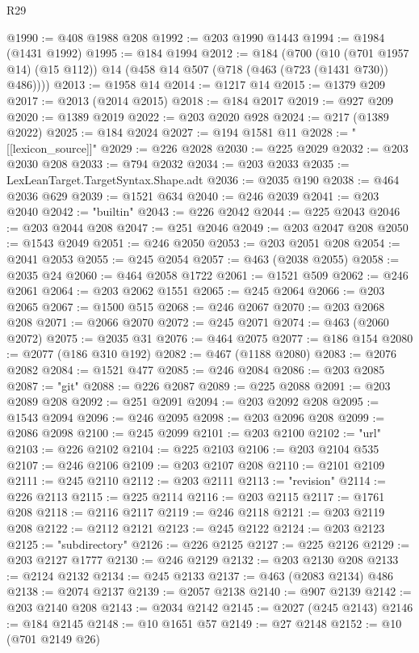 \begin{lexlean}{R29}
\begin{coremodule}
@1990 := @408 @1988 @208
@1992 := @203 @1990 @1443
@1994 := @1984 (@1431 @1992)
@1995 := @184 @1994
@2012 := @184
    (@700
      (@10 (@701 @1957 @14) (@15 @112))
      @14
      (@458 @14 @507 (@718 (@463 (@723 (@1431 @730)) @486))))
@2013 := @1958 @14
@2014 := @1217 @14
@2015 := @1379 @209
@2017 := @2013 (@2014 @2015)
@2018 := @184 @2017
@2019 := @927 @209
@2020 := @1389 @2019
@2022 := @203 @2020 @928
@2024 := @217 (@1389 @2022)
@2025 := @184 @2024
@2027 := @194 @1581 @11
@2028 := "[[lexicon_source]]"
@2029 := @226 @2028
@2030 := @225 @2029
@2032 := @203 @2030 @208
@2033 := @794 @2032
@2034 := @203 @2033
@2035 := LexLeanTarget.TargetSyntax.Shape.adt
@2036 := @2035 @190
@2038 := @464 @2036 @629
@2039 := @1521 @634
@2040 := @246 @2039
@2041 := @203 @2040
@2042 := "builtin"
@2043 := @226 @2042
@2044 := @225 @2043
@2046 := @203 @2044 @208
@2047 := @251 @2046
@2049 := @203 @2047 @208
@2050 := @1543 @2049
@2051 := @246 @2050
@2053 := @203 @2051 @208
@2054 := @2041 @2053
@2055 := @245 @2054
@2057 := @463 (@2038 @2055)
@2058 := @2035 @24
@2060 := @464 @2058 @1722
@2061 := @1521 @509
@2062 := @246 @2061
@2064 := @203 @2062 @1551
@2065 := @245 @2064
@2066 := @203 @2065
@2067 := @1500 @515
@2068 := @246 @2067
@2070 := @203 @2068 @208
@2071 := @2066 @2070
@2072 := @245 @2071
@2074 := @463 (@2060 @2072)
@2075 := @2035 @31
@2076 := @464 @2075
@2077 := @186 @154
@2080 := @2077 (@186 @310 @192)
@2082 := @467 (@1188 @2080)
@2083 := @2076 @2082
@2084 := @1521 @477
@2085 := @246 @2084
@2086 := @203 @2085
@2087 := "git"
@2088 := @226 @2087
@2089 := @225 @2088
@2091 := @203 @2089 @208
@2092 := @251 @2091
@2094 := @203 @2092 @208
@2095 := @1543 @2094
@2096 := @246 @2095
@2098 := @203 @2096 @208
@2099 := @2086 @2098
@2100 := @245 @2099
@2101 := @203 @2100
@2102 := "url"
@2103 := @226 @2102
@2104 := @225 @2103
@2106 := @203 @2104 @535
@2107 := @246 @2106
@2109 := @203 @2107 @208
@2110 := @2101 @2109
@2111 := @245 @2110
@2112 := @203 @2111
@2113 := "revision"
@2114 := @226 @2113
@2115 := @225 @2114
@2116 := @203 @2115
@2117 := @1761 @208
@2118 := @2116 @2117
@2119 := @246 @2118
@2121 := @203 @2119 @208
@2122 := @2112 @2121
@2123 := @245 @2122
@2124 := @203 @2123
@2125 := "subdirectory"
@2126 := @226 @2125
@2127 := @225 @2126
@2129 := @203 @2127 @1777
@2130 := @246 @2129
@2132 := @203 @2130 @208
@2133 := @2124 @2132
@2134 := @245 @2133
@2137 := @463 (@2083 @2134) @486
@2138 := @2074 @2137
@2139 := @2057 @2138
@2140 := @907 @2139
@2142 := @203 @2140 @208
@2143 := @2034 @2142
@2145 := @2027 (@245 @2143)
@2146 := @184 @2145
@2148 := @10 @1651 @57
@2149 := @27 @2148
@2152 := @10 (@701 @2149 @26)

\end{coremodule}
\end{lexlean}
